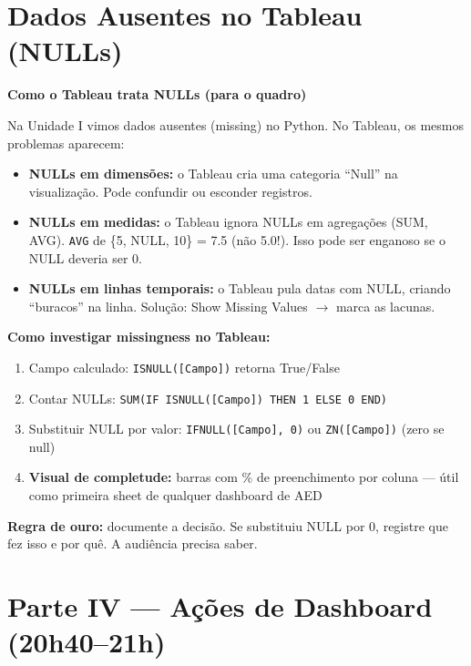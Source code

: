\section{Dados Ausentes no Tableau (NULLs)}

\begin{BoardBox}
\textbf{Como o Tableau trata NULLs (para o quadro)}

Na Unidade I vimos dados ausentes (missing) no Python. No Tableau, os
mesmos problemas aparecem:

\begin{itemize}
  \item \textbf{NULLs em dimensões:} o Tableau cria uma categoria ``Null''
na visualização. Pode confundir ou esconder registros.
  \item \textbf{NULLs em medidas:} o Tableau ignora NULLs em
agregações (SUM, AVG). \texttt{AVG} de \{5, NULL, 10\} = 7.5
(não 5.0!). Isso pode ser enganoso se o NULL deveria ser 0.
  \item \textbf{NULLs em linhas temporais:} o Tableau pula datas
com NULL, criando ``buracos'' na linha. Solução:
Show Missing Values $\to$ marca as lacunas.
\end{itemize}

\textbf{Como investigar missingness no Tableau:}
\begin{enumerate}
  \item Campo calculado: \texttt{ISNULL([Campo])} retorna True/False
  \item Contar NULLs: \texttt{SUM(IF ISNULL([Campo]) THEN 1 ELSE 0 END)}
  \item Substituir NULL por valor:
  \texttt{IFNULL([Campo], 0)} ou \texttt{ZN([Campo])} (zero se null)
  \item \textbf{Visual de completude:} barras com \% de preenchimento
  por coluna — útil como primeira sheet de qualquer dashboard de AED
\end{enumerate}

\textbf{Regra de ouro:} documente a decisão. Se substituiu NULL por 0,
registre que fez isso e por quê. A audiência precisa saber.
\end{BoardBox}

\section{Parte IV — Ações de Dashboard (20h40–21h)}

